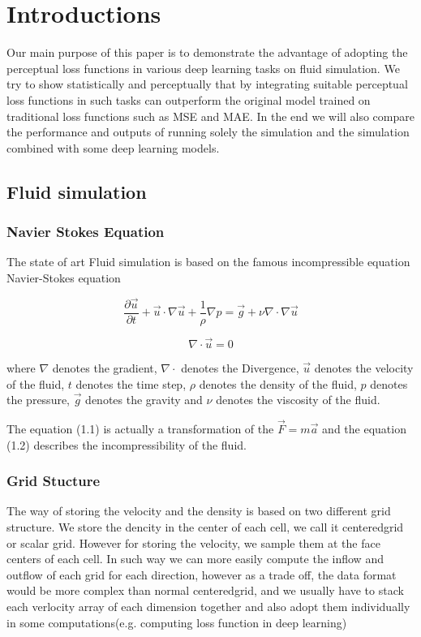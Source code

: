 \documentclass[a4paper,12pt,twoside]{report}
\begin{document}

\chapter{Introductions}

Our main purpose of this paper is to demonstrate the advantage of adopting the perceptual loss functions in various deep learning tasks on fluid simulation. We try to show statistically and perceptually that by integrating suitable perceptual loss functions in such tasks can outperform the original model trained on traditional loss functions such as MSE and MAE. In the end we will also compare the performance and outputs of running solely the simulation and the simulation combined with some deep learning models.
\section{Fluid simulation}
\subsection{Navier Stokes Equation}
The state of art Fluid simulation is based on the famous incompressible equation Navier-Stokes equation

\begin{equation}
\frac{\partial \vec u}{\partial t}+\vec u\cdot \nabla\vec u+\frac1\rho\nabla p = \vec g + \nu\nabla\cdot\nabla\vec{u}
\end{equation}

\begin{equation}
{\nabla}\cdot\vec{u} = 0
\end{equation}

where $\nabla$ denotes the gradient, $\nabla\cdot$ denotes the Divergence, $\vec{u}$ denotes the velocity of the fluid, $t$ denotes the time step, $\rho$ denotes the density of the fluid, $p$ denotes the pressure, $\vec{g}$ denotes the gravity and $\nu$ denotes the viscosity of the fluid.

The equation (1.1) is actually a transformation of the $\vec{F} = m\vec{a}$ and the equation (1.2) describes the incompressibility of the fluid.
\subsection{Grid Stucture}
The way of storing the velocity and the density is based on two different grid structure. We store the dencity in the center of each cell, we call it centeredgrid or scalar grid. However for storing the velocity, we sample them at the face centers of each cell\cite{doi:10.1063/1.1761178}. In such way we can more easily compute the inflow and outflow of each grid for each direction, however as a trade off, the data format would be more complex than normal centeredgrid, and we usually have to stack each verlocity array of each dimension together and also adopt them individually in some computations(e.g. computing loss function in deep learning)
\end{document}
